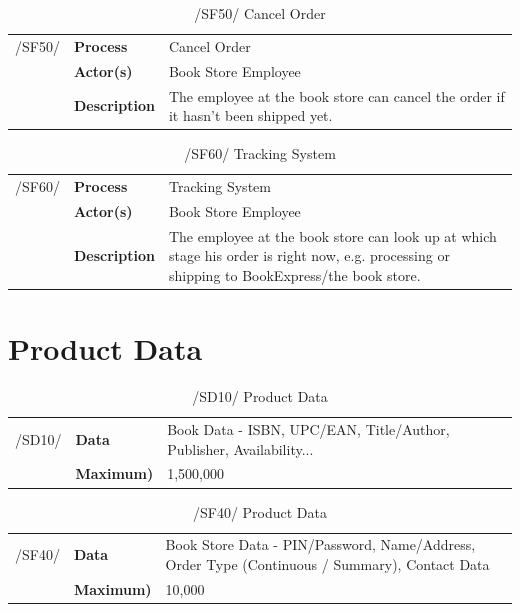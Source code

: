 \documentclass[11pt,a4paper,oneside,svgnames]{report}
\begin{document}
\begin{table}[H]
\centering
\begin{tabular}{p{1.5cm}p{3cm}p{8cm}}
\cellcolor{white}/SF50/	& \textbf{Process}	& Cancel Order \\
\cellcolor{white}		& \textbf{Actor(s)} &   Book Store Employee\\
\cellcolor{white}		& \textbf{Description}	 &  The employee at the book store can cancel the order if it hasn't been shipped yet. \\
\end{tabular}
\caption{/SF50/ Cancel Order}
\end{table}

\begin{table}[H]
\centering
\begin{tabular}{p{1.5cm}p{3cm}p{8cm}}
\cellcolor{white}/SF60/	& \textbf{Process}	&  Tracking System \\
\cellcolor{white}		& \textbf{Actor(s)} &  Book Store Employee\\
\cellcolor{white}		& \textbf{Description}	 &  The employee at the book store can look up at which stage his order is right now, e.g. processing or shipping to BookExpress/the book store.\\
\end{tabular}
\caption{/SF60/ Tracking System }
\end{table}

\chapter{Product Data}

\begin{table}[H]
\centering
\begin{tabular}{p{1.5cm}p{3cm}p{8cm}}
\cellcolor{white}/SD10/	& \textbf{Data}	& Book Data - ISBN, UPC/EAN, Title/Author, Publisher, Availability... \\
\cellcolor{white}	 & \textbf{Maximum)} &  1,500,000\\
\end{tabular}
\caption{/SD10/ Product Data }
\end{table}

\begin{table}[H]
\centering
\begin{tabular}{p{1.5cm}p{3cm}p{8cm}}
\cellcolor{white}/SF40/	& \textbf{Data}	&  Book Store Data - PIN/Password, Name/Address, Order Type (Continuous / Summary), Contact Data \\
\cellcolor{white}		& \textbf{Maximum)} &  10,000\\
\end{tabular}
\caption{/SF40/ Product Data}
\end{table}
\end{document}

